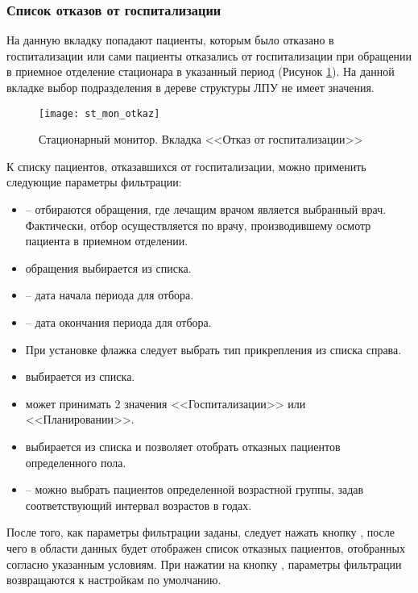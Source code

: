 \subsubsection{Список отказов от госпитализации}

На данную вкладку попадают пациенты, которым было отказано в госпитализации или сами пациенты отказались от госпитализации при обращении в приемное отделение стационара в указанный период (Рисунок \ref{img_st_mon_otkaz}). На данной вкладке выбор подразделения в дереве структуры ЛПУ не имеет значения.

\begin{figure}[ht]\centering
   \texttt{[image: st\_mon\_otkaz]}
   \caption{Стационарный монитор. Вкладка <<Отказ от госпитализации>>}
   \label{img_st_mon_otkaz}
\end{figure}

К списку пациентов, отказавшихся от госпитализации, можно применить следующие параметры фильтрации:
\begin{itemize}
 \item {} – отбираются обращения, где лечащим врачом является выбранный врач. Фактически, отбор осуществляется по врачу, производившему осмотр пациента в приемном отделении.
 \item {} обращения выбирается из списка.
 \item {} – дата начала периода для отбора.
 \item {} – дата окончания периода для отбора.
 \item При установке флажка  следует выбрать тип прикрепления из списка справа.
 \item {} выбирается из списка.
 \item {} может принимать 2 значения <<Госпитализации>> или <<Планировании>>.
 \item {} выбирается из списка и позволяет отобрать отказных пациентов определенного пола.
 \item {} – можно выбрать пациентов определенной возрастной группы, задав соответствующий интервал возрастов в годах.
\end{itemize}

После того, как параметры фильтрации заданы, следует нажать кнопку , после чего в области данных будет отображен список отказных пациентов, отобранных согласно указанным условиям. При нажатии на кнопку , параметры фильтрации возвращаются к настройкам по умолчанию.

